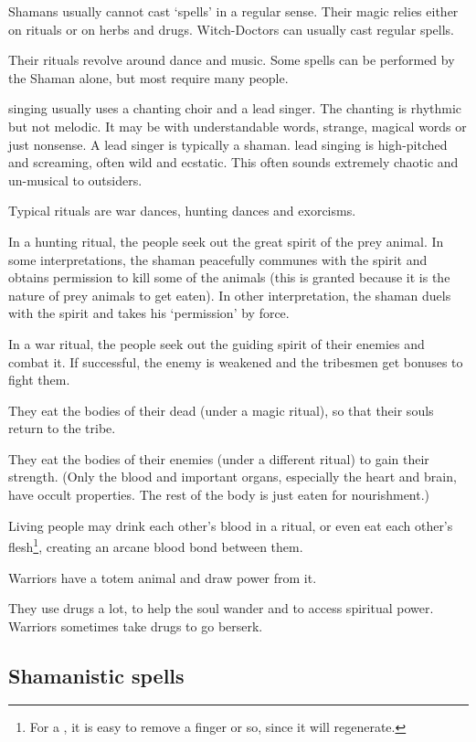 Shamans usually cannot cast `spells' in a regular sense. Their magic relies either on rituals or on herbs and drugs. Witch-Doctors can usually cast regular spells. 

Their rituals revolve around dance and music. Some spells can be performed by the Shaman alone, but most require many people. 

\Meccaran{} singing usually uses a chanting choir and a lead singer. The chanting is rhythmic but not melodic. It may be with understandable words, strange, magical words or just nonsense. A lead singer is typically a shaman. \Meccaran{} lead singing is high-pitched and screaming, often wild and ecstatic. This often sounds extremely chaotic and un-musical to outsiders. 

Typical rituals are war dances, hunting dances and exorcisms. 

In a hunting ritual, the people seek out the great spirit of the prey animal. In some interpretations, the shaman peacefully communes with the spirit and obtains permission to kill some of the animals (this is granted because it is the nature of prey animals to get eaten). In other interpretation, the shaman duels with the spirit and takes his `permission' by force. 

In a war ritual, the people seek out the guiding spirit of their enemies and combat it. If successful, the enemy is weakened and the tribesmen get bonuses to fight them. 

They eat the bodies of their dead (under a magic ritual), so that their souls return to the tribe. 

They eat the bodies of their enemies (under a different ritual) to gain their strength. (Only the blood and important organs, especially the heart and brain, have occult properties. The rest of the body is just eaten for nourishment.) 

Living people may drink each other's blood in a ritual, or even eat each other's flesh\footnote{For a \meccaran, it is easy to remove a finger or so, since it will regenerate.}, creating an arcane blood bond between them. 

Warriors have a totem animal and draw power from it. 

They use drugs a lot, to help the soul wander and to access spiritual power. Warriors sometimes take drugs to go berserk. 



\subsection{Shamanistic spells}

